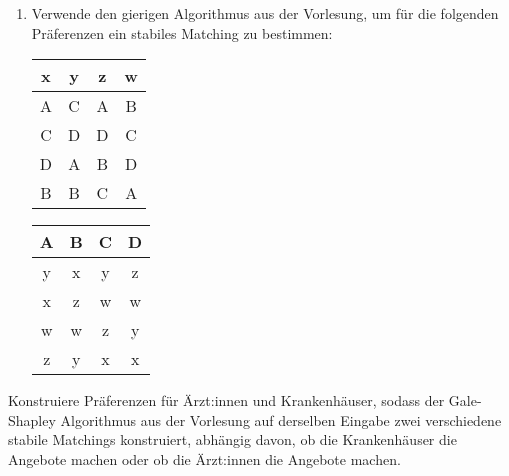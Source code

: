 \documentclass{uebung_cs}
\begin{document}
\begin{aufgabe}
\begin{enumerate}
\begin{center}
        \end{center}
        \item Verwende den gierigen Algorithmus aus der Vorlesung, um für die folgenden Präferenzen ein stabiles Matching zu bestimmen:
        \begin{center}
            \begin{tabular}{c|c|c|c}
                x & y & z & w \\ \hline
                A & C & A & B \\
                C & D & D & C \\
                D & A & B & D \\
                B & B & C & A \\
            \end{tabular}
            \hspace{1cm}
            \begin{tabular}{c|c|c|c}
                A & B & C & D \\ \hline
                y & x & y & z \\
                x & z & w & w \\
                w & w & z & y \\
                z & y & x & x \\
            \end{tabular}
        \end{center}
    \end{enumerate}
\end{aufgabe}

\begin{aufgabe}
    Konstruiere Präferenzen für Ärzt:innen und Krankenhäuser, sodass der Gale-Shapley Algorithmus aus der Vorlesung auf derselben Eingabe zwei verschiedene stabile Matchings konstruiert, abhängig davon, ob die Krankenhäuser die Angebote machen oder ob die Ärzt:innen die Angebote machen. 
\end{aufgabe}
\end{document}
